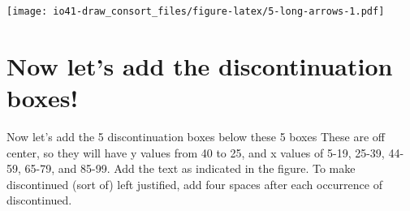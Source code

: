 \documentclass[
]{book}
\newenvironment{Shaded}{\begin{snugshade}}{\end{snugshade}}
\newcommand{\CommentTok}[1]{\textcolor[rgb]{0.56,0.35,0.01}{\textit{#1}}}
\newcommand{\DataTypeTok}[1]{\textcolor[rgb]{0.13,0.29,0.53}{#1}}
\newcommand{\DecValTok}[1]{\textcolor[rgb]{0.00,0.00,0.81}{#1}}
\newcommand{\FloatTok}[1]{\textcolor[rgb]{0.00,0.00,0.81}{#1}}
\newcommand{\KeywordTok}[1]{\textcolor[rgb]{0.13,0.29,0.53}{\textbf{#1}}}
\newcommand{\NormalTok}[1]{#1}
\newcommand{\OperatorTok}[1]{\textcolor[rgb]{0.81,0.36,0.00}{\textbf{#1}}}
\newcommand{\StringTok}[1]{\textcolor[rgb]{0.31,0.60,0.02}{#1}}
\begin{document}
\begin{Shaded}
\end{Shaded}

\texttt{[image: io41-draw\_consort\_files/figure-latex/5-long-arrows-1.pdf]}

\hypertarget{now-lets-add-the-discontinuation-boxes}{%
\section{Now let's add the discontinuation boxes!}\label{now-lets-add-the-discontinuation-boxes}}

Now let's add the 5 discontinuation boxes below these 5 boxes These are off center, so they will have y values from 40 to 25, and x values of 5-19, 25-39, 44-59, 65-79, and 85-99. Add the text as indicated in the figure. To make discontinued (sort of) left justified, add four spaces after each occurrence of discontinued.
\end{document}
